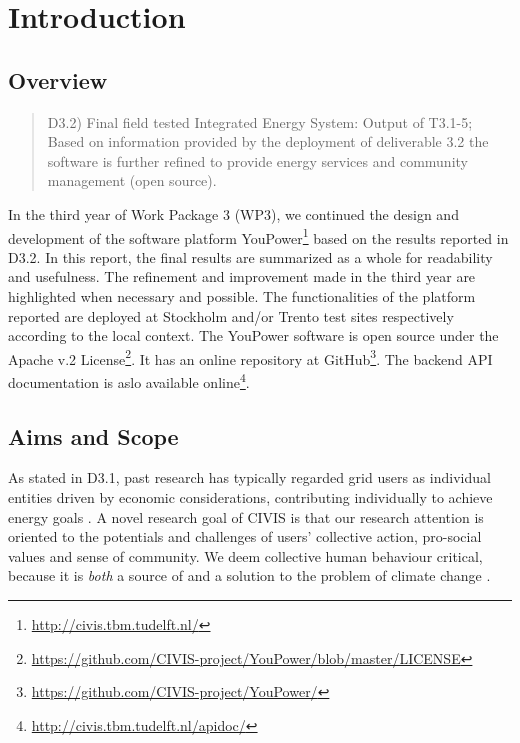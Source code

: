 
\section{Introduction}

\subsection{Overview}

\begin{quote}
D3.2) Final field tested Integrated Energy System: Output of T3.1-5; Based on information provided by the deployment of deliverable 3.2 the software is further refined to provide energy services and community management (open source). 
\end{quote}

In the third year of Work Package 3 (WP3), we continued the design and development of the software platform YouPower\footnote{ \url{http://civis.tbm.tudelft.nl/}} based on the results reported in D3.2. In this report, the final results are summarized as a whole for readability and usefulness. The refinement and improvement made in the third year are highlighted when necessary and possible. 
% 
The functionalities of the platform reported are deployed at Stockholm and/or Trento test sites respectively according to the local context. The YouPower software is open source under the Apache v.2 License\footnote{\url{https://github.com/CIVIS-project/YouPower/blob/master/LICENSE}}. It has  an online repository at GitHub\footnote{ \url{https://github.com/CIVIS-project/YouPower/}}. 
The backend API documentation is aslo available online\footnote{ \url{http://civis.tbm.tudelft.nl/apidoc/}}. 


\subsection{Aims and Scope}

As stated in D3.1, past research has typically regarded grid users as individual entities driven by economic considerations, contributing individually to achieve energy goals \citep[e.g.][]{Barbieri2013,Buoro2012,Martinez-Lera2013}. 
A novel research goal of CIVIS is that our research attention is oriented to the potentials and challenges of users' collective action, pro-social values and sense of community. We deem collective human behaviour critical, because it is \textit{both} a source of and a solution to the problem of climate change \citep{Masson2014}.  

